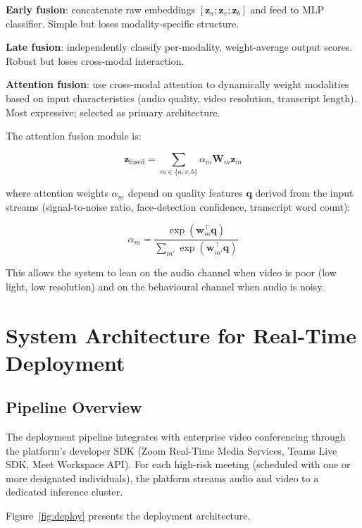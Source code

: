 \documentclass[sigconf,nonacm]{acmart}
\begin{document}
\textbf{Early fusion}: concatenate raw embeddings $[\mathbf{z}_a;
\mathbf{z}_v; \mathbf{z}_b]$ and feed to MLP classifier. Simple but
loses modality-specific structure.

\textbf{Late fusion}: independently classify per-modality, weight-average
output scores. Robust but loses cross-modal interaction.

\textbf{Attention fusion}: use cross-modal attention to dynamically
weight modalities based on input characteristics (audio quality,
video resolution, transcript length). Most expressive; selected as
primary architecture.

The attention fusion module is:

\begin{equation}
  \mathbf{z}_{\text{fused}} = \sum_{m \in \{a,v,b\}} \alpha_m \mathbf{W}_m \mathbf{z}_m
\end{equation}

where attention weights $\alpha_m$ depend on quality features
$\mathbf{q}$ derived from the input streams (signal-to-noise ratio,
face-detection confidence, transcript word count):

\begin{equation}
  \alpha_m = \frac{\exp(\mathbf{w}_m^\top \mathbf{q})}{\sum_{m'} \exp(\mathbf{w}_{m'}^\top \mathbf{q})}
\end{equation}

This allows the system to lean on the audio channel when video is
poor (low light, low resolution) and on the behavioural channel when
audio is noisy.

\section{System Architecture for Real-Time Deployment}

\subsection{Pipeline Overview}

The deployment pipeline integrates with enterprise video conferencing
through the platform's developer SDK (Zoom Real-Time Media Services,
Teams Live SDK, Meet Workspace API). For each high-risk meeting
(scheduled with one or more designated individuals), the platform
streams audio and video to a dedicated inference cluster.

Figure~\ref{fig:deploy} presents the deployment architecture.
\end{document}
